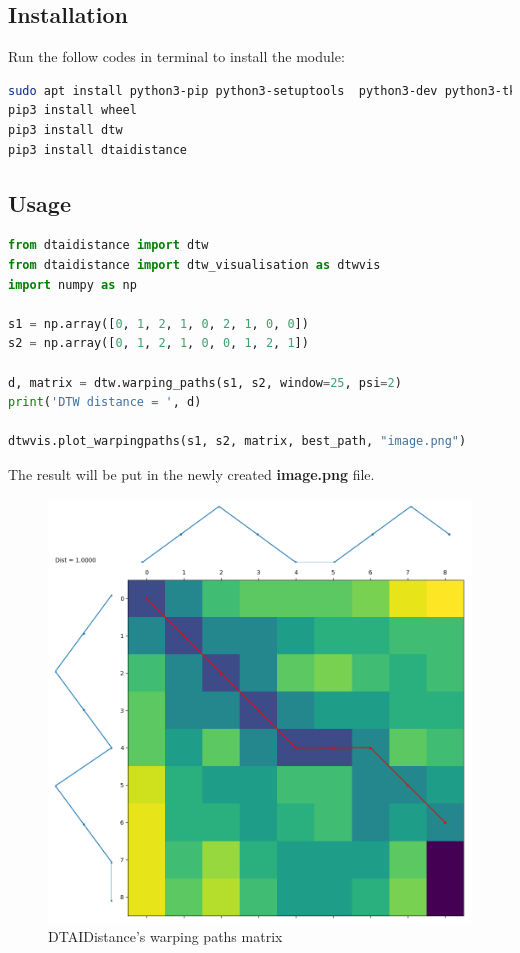 \documentclass[12pt, a4paper, portrait]{article}
\begin{document}
\subsection{Installation}
Run the follow codes in terminal to install the module:
\begin{lstlisting}[language=bash, caption=Used Linux Mint 19]
sudo apt install python3-pip python3-setuptools  python3-dev python3-tk
pip3 install wheel
pip3 install dtw
pip3 install dtaidistance
\end{lstlisting}

\subsection{Usage}
\begin{lstlisting}[language=Python, caption=Script to calculate DTW distance and plot warping paths matrix ]
from dtaidistance import dtw
from dtaidistance import dtw_visualisation as dtwvis
import numpy as np

s1 = np.array([0, 1, 2, 1, 0, 2, 1, 0, 0])
s2 = np.array([0, 1, 2, 1, 0, 0, 1, 2, 1])

d, matrix = dtw.warping_paths(s1, s2, window=25, psi=2)
print('DTW distance = ', d)

dtwvis.plot_warpingpaths(s1, s2, matrix, best_path, "image.png")
\end{lstlisting}

\clearpage
The result will be put in the newly created \textbf{image.png} file.
\begin{figure}[ht]
\centering
\includegraphics[scale=0.60]{dtaidistance-sample.png}
\caption{DTAIDistance's warping paths matrix}
\label{}
\end{figure}
\end{document}
